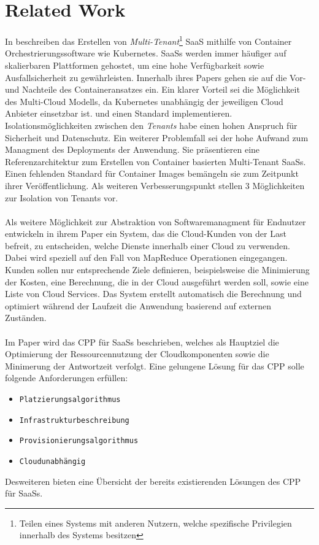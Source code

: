 \section{Related Work}
In \cite{Truyen2016} beschreiben \citeauthor{Truyen2016}
das Erstellen von \emph{Multi-Tenant}\footnote{Teilen eines Systems mit anderen Nutzern, welche spezifische Privilegien innerhalb des Systems besitzen}
\acf{SaaS} mithilfe von Container Orchestrierungssoftware wie Kubernetes.
\acp{SaaS} werden immer häufiger auf skalierbaren Plattformen gehostet, um eine hohe Verfügbarkeit sowie Ausfallsicherheit zu gewährleisten.
Innerhalb ihres Papers gehen sie auf die Vor- und Nachteile des Containeransatzes ein. 
Ein klarer Vorteil sei die Möglichkeit des Multi-Cloud Modells, da Kubernetes unabhängig der jeweiligen Cloud Anbieter einsetzbar ist.
und einen Standard implementieren.
Isolationsmöglichkeiten zwischen den \emph{Tenants} habe einen hohen Anspruch für Sicherheit und Datenschutz.
Ein weiterer Problemfall sei der hohe Aufwand zum Managment des Deployments der Anwendung.
Sie präsentieren eine Referenzarchitektur zum Erstellen von Container basierten Multi-Tenant SaaSs.
Einen fehlenden Standard für Container Images bemängeln sie zum Zeitpunkt ihrer Veröffentlichung.
Als weiteren Verbesserungspunkt stellen \citeauthor{Truyen2016} 3 Möglichkeiten zur Isolation von Tenants vor.

\paragraph{}
Als weitere Möglichkeit zur Abstraktion von Softwaremanagment für Endnutzer entwickeln \citeauthor{Wieder2012} in ihrem Paper
\cite{Wieder2012} ein System, das die Cloud-Kunden von der Last befreit, zu entscheiden, welche Dienste innerhalb einer Cloud zu verwenden.
Dabei wird speziell auf den Fall von MapReduce Operationen eingegangen. Kunden sollen nur entsprechende Ziele definieren, beispielsweise
die Minimierung der Kosten, eine Berechnung, die in der Cloud ausgeführt werden soll, sowie eine Liste von Cloud Services.
Das System erstellt automatisch die Berechnung und optimiert während der Laufzeit die Anwendung basierend auf externen Zuständen.

\paragraph{}
Im Paper \cite{Bousselmi2014} wird das \ac{CPP} für SaaSs beschrieben, welches als Hauptziel die Optimierung der Ressourcennutzung
der Cloudkomponenten sowie die Minimerung der Antwortzeit verfolgt.
Eine gelungene Lösung für das \ac{CPP} solle folgende Anforderungen erfüllen:
\begin{itemize}
  \item \texttt{Platzierungsalgorithmus}
  \item \texttt{Infrastrukturbeschreibung}
  \item \texttt{Provisionierungsalgorithmus}
  \item \texttt{Cloudunabhängig}
\end{itemize}
Desweiteren bieten \citeauthor{Bousselmi2014} eine Übersicht der bereits existierenden Lösungen des \ac{CPP} für \acp{SaaS}.